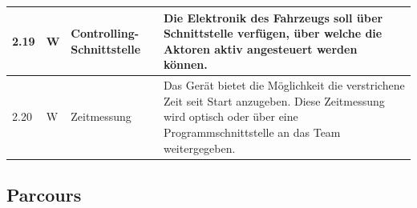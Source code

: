 \documentclass[../main.tex]{subfiles}
\begin{document}
\begin{tabular}{|l|p{0.5cm}|p{4cm}|p{10cm}|}
  \hline
  2.19         & W          & Controlling-Schnittstelle & Die Elektronik des Fahrzeugs soll über Schnittstelle verfügen, über welche die Aktoren aktiv angesteuert werden können.                                                                                                     \\
  \hline
  2.20         & W          & Zeitmessung               & Das Gerät bietet die Möglichkeit die verstrichene Zeit seit Start anzugeben. Diese Zeitmessung wird optisch oder über eine Programmschnittstelle an das Team weitergegeben.                                                 \\
\end{tabular}

\subsection{Parcours}
\end{document}
